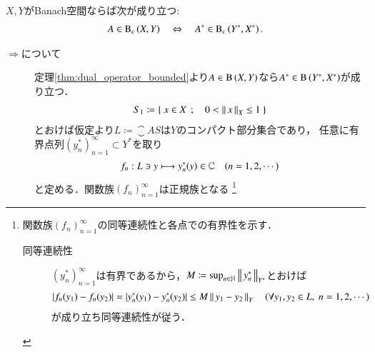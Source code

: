 	\begin{screen}
		\begin{thm}[コンパクト作用素の共役作用素のコンパクト性]
			$X,Y$がBanach空間ならば次が成り立つ:
			\begin{align}
				A \in \mathrm{B}_c\left(X,Y\right)  \quad \Leftrightarrow \quad A^* \in \mathrm{B}_c\left(Y^*,X^*\right) .
			\end{align}
			\label{thm:dual_operator_of_compact_operators}
		\end{thm}
	\end{screen}
	
	\begin{prf}\mbox{}
		\begin{description}
			\item[$\Rightarrow$について]
				定理\ref{thm:dual_operator_bounded}より$A \in \mathrm{B}\left(X,Y\right) $なら$A^* \in \mathrm{B}\left(Y^*,X^*\right) $が成り立つ．
				\begin{align}
					S_1 \coloneqq \left\{\ x \in X\ \, ; \quad 0 < \left\|\, x\, \right\|_{X} \leq 1\ \right\}
				\end{align}
				とおけば仮定より$L \coloneqq \closure{AS}$は$Y$のコンパクト部分集合であり，
				任意に有界点列$(y_n^*)_{n=1}^{\infty} \subset Y^*$を取り
				\begin{align}
					f_n:L \ni y \longmapsto y_n^*(y) \in \mathbb{C}
					\quad (n=1,2,\cdots)
				\end{align}
				と定める．関数族$(f_n)_{n=1}^{\infty}$は正規族となる
				\footnote{
					関数族$(f_n)_{n=1}^{\infty}$の同等連続性と各点での有界性を示す．
					\begin{description}
						\item[同等連続性]
							$(y_n^*)_{n=1}^{\infty}$は有界であるから，$M \coloneqq \operatorname*{sup}_{n\in\mathbb{N}} \left\|\, y_n^*\, \right\|_{Y^*}$とおけば
							\begin{align}
								|f_n(y_1) - f_n(y_2)| = |y_n^*(y_1) - y_n^*(y_2)| \leq M\Norm{y_1 - y_2}{Y} \quad (\forall y_1,y_2 \in L,\ n=1,2,\cdots)
							\end{align}
							が成り立ち同等連続性が従う．
						

\end{description}}
\end{description}
\end{prf}
